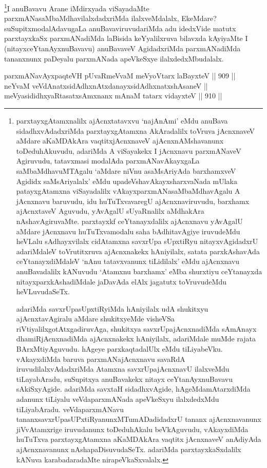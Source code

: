 \begin{artha}
\footnote{parxtayxgAtamxnalilx ajAcnxtatavxvu `najAnAmi' eMdu anuBava sidadhxvAdadxriMda parxtayxgAtamxna AkAradalilx toVruva jAcnxnaveV aMdare aKaMDAkAra vaqtitxjAcnxnaveV ajAcnxnAMshavanunx toDeduhAkuvudu, adariMda A viSayakekx I jAcnxnavu parxmANaveV Agiruvudu, tatavxmasi modalAda parxmANavAkayxgaLa saMbaMdhavuMTAgalu `aMdare niVnu asaMsAriyAda barxhamxveV Agididx saMsAriyalalx' eMdu upadeVshavAkayxsharxvaNada mUlaka patayxgAtamxna viSayadalilx vAkayxparxmANasaMbaMdhavAgalu A jAcnxnavu baruvudu, idu huTuTxvavaregU ajAcnxnaviruvudu, barxhamx ajAcnxtaveV Aguvudu, yAvAgalU sUyaRnalilx aMdhakAra nAshavAgiruvaMte. parxtayxkf ceYtanayxdalilx ajAcnxnavu yAvAgalU aMdare jAcnxnavu huTuTxvamodalu saha bAdhitavAgiye iruvudeMdu heVLalu sAdhayxvilalx cidAtamxna savxrUpa sUpxtiRyu nitayxvAgidadxrU adariMdaleV toVrutitxruva ajAcnxnakekx hAniyilalx, satata parxkAshavAda ceYtanayxdiMdaleV `nAnu tatavxvanunx tiLidilalx' eMdu ajAcnxnavu anuBavadalilx kANuvudu `Atamxnu barxhamx' eMba shurxtiyu ceYtanayxda nitayxparxkAshadiMdale jaDavAda elAlx jagatutx toVruvudeMdu heVLuvudaSeTx.

adariMda savxrUpasUpxtiRyiMda hAniyilalx udA shukitxyu ajAcnxtavAgiralu aMdare shukitxyeMde visheVSa riVtiyalilxgotAtxgadiruvAga, shukitxya savxrUpajAcnxnadiMda sAmAnayx dhamiRjAcnxnadiMda ajAcnxnakekx hAniyilalx, adariMdale muMde rajata BArxMtiyAguvudu. hAgeye parxkaqtadalUlx eMdu tiLiyabeVku. vAkayxdiMda baruva parxmANajAcnxnavu savaRdA iruvudilalxvAdadxriMda Atamxna savxrUpajAcnxnavU ilalxveMdu tiLayabAradu, suSupitxya anuBavakekx nitayx ceYtanAyxnuBavavu sAkiSxyAgide. adariMda savxtaH sidadhxvAgide, hAgeMdamAtarxdiMda adanunx tiLiyalu veVdaparxmANada apeVkeSxyu ilalxdedxMdu tiLiyabAradu. veVdaparxmANavu tananxsavxrUpasUPxtiRyanunxMTumADadidadxrU tananx ajAcnxnavanunx jiVvAtamxrige iruvudanunx toDeduhAkalu beVkAguvudu, vAkayxdiMda huTuTxva parxtayxgAtamxna aKaMDAkAra vaqtitx jAcnxnaveV anAdiyAda ajAcnxnavanunx nAshapaDisuvudaSeTx. adariMda parxtayxkaSxdalilx kANuva karabadaradaMte nirapeVkaSxvalalx.}I anuBavavu Arane iMdirxyada viSayadaMte parxmANasaMbaMdhavilalxdadxriMda ilalxveMdalalx, EkeMdare? suSupitx\-\break modalAdavugaLa anuBavaviruvudariMda adu idedxVide matutx parxtayxkaSx parxmANadiMda laBisida keYyalilxruva bilavxda kAyiyaMte I (nitayxceYtanAyxnuBavavu) anuBavaveV AgidadxriMda parxmANadiMda tananxnunx paDeyalu parxmANada apeVkeSxye ilalxdedxMbudalalx.
\end{artha}

\begin{shl}
parxmANavAyxpaqteVH pUvaRmeVvaM meVyoV\s tarx laBayxteV \hfill || 909 ||  \\
neYvaM veVdAnatxsidAdhxnAtxdanayxsidAdhxnatxshAsaneV || \\
meVyasididhxyaRtasatxsAmxnanx mAnaM tatarx vidayxteV \hfill || 910 ||  
\end{shl}

